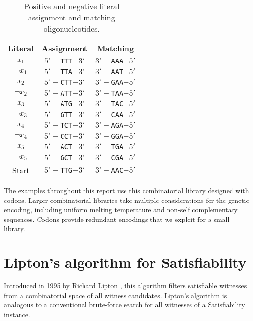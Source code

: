 \begin{table}[htdp]
\caption{Positive and negative literal assignment and matching oligonucleotides.  }
\begin{center}
\begin{tabular}{|c|c|c|}
\hline
\textbf{Literal} & \textbf{Assignment} & \textbf{Matching} \\ \hline
$x_1$ & $5'-$\texttt{TTT}$-3'$ & $3'-$\texttt{AAA}$-5'$ \\ 
$\neg x_1$ & $5'-$\texttt{TTA}$-3'$ & $3'-$\texttt{AAT}$-5'$ \\ \hline
$x_2$ & $5'-$\texttt{CTT}$-3'$ & $3'-$\texttt{GAA}$-5'$ \\ 
$\neg x_2$ & $5'-$\texttt{ATT}$-3'$ & $3'-$\texttt{TAA}$-5'$ \\ \hline
$x_3$ & $5'-$\texttt{ATG}$-3'$ & $3'-$\texttt{TAC}$-5'$ \\ 
$\neg x_3$ & $5'-$\texttt{GTT}$-3'$ & $3'-$\texttt{CAA}$-5'$ \\ \hline
$x_4$ & $5'-$\texttt{TCT}$-3'$ & $3'-$\texttt{AGA}$-5'$ \\ 
$\neg x_4$ & $5'-$\texttt{CCT}$-3'$ & $3'-$\texttt{GGA}$-5'$ \\ \hline
$x_5$ & $5'-$\texttt{ACT}$-3'$ & $3'-$\texttt{TGA}$-5'$ \\ 
$\neg x_5$ & $5'-$\texttt{GCT}$-3'$ & $3'-$\texttt{CGA}$-5'$ \\ \hline
Start & $5'-$\texttt{TTG}$-3'$ & $3'-$\texttt{AAC}$-5'$ \\ \hline
\end{tabular}
\end{center}
\label{smallCombinatorialLibrary}
\end{table}%

\FloatBarrier

The examples throughout this report use this combinatorial library designed with codons.  Larger combinatorial libraries \cite{dnaComputingModels2008} take multiple considerations for the genetic encoding, including uniform melting temperature and non-self complementary sequences.  Codons provide redundant encodings that we exploit for a small library.   


\section{Lipton's algorithm for {\sc Satisfiability}}


Introduced in 1995 by Richard Lipton \cite{Lipton95usingdna}, this algorithm filters satisfiable witnesses from a combinatorial space of all witness candidates.  Lipton's algorithm is analogous to a conventional brute-force search for all witnesses of a {\sc Satisfiability} instance.

